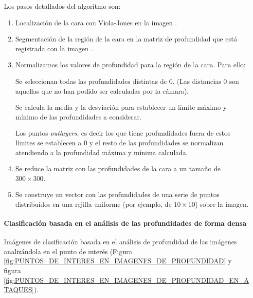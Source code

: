 Los pasos detallados del algoritmo son:
\begin{enumerate}
\item
Localización de la cara con \Gls{Viola-Jones} en la imagen .

\item
Segmentación de la región de la cara en la matriz de profundidad que está registrada con la imagen .

\item
Normalizamos los valores de profundidad para la región de la cara. Para ello:

Se seleccionan todas las profundidades distintas de $0$. (Las distancias $0$ son aquellas que no han podido ser calculadas por la cámara).

Se calcula la media y la desviación para establecer un límite máximo y mínimo de las profundidades a considerar.


Los puntos \textit{outlayers}, es decir los que tiene profundidades fuera de estos límites se establecen a $0$ y el resto de las profundidades se normalizan atendiendo a la profundidad máxima y mínima calculada.


\item
Se reduce la matriz con las profundidades de la cara a un tamaño de $300\times300$.

\item
Se construye un vector con las profundidades de una serie de puntos distribuidos en una rejilla uniforme (por ejemplo, de $10\times10$) sobre la imagen. 

\end{enumerate}

\paragraph{\textbf{Clasificación basada en el análisis de las profundidades de forma densa}}

Imágenes de clasificación basada en el análisis de profundidad de las imágenes analizándola en el punto de interés (Figura \ref{fig:PUNTOS_DE_INTERES_EN_IMAGENES_DE_PROFUNDIDAD} y figura \ref{fig:PUNTOS_DE_INTERES_EN_IMAGENES_DE_PROFUNDIDAD_EN_ATAQUES}).

